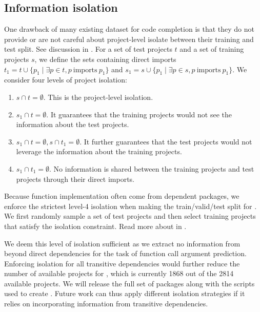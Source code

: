 \subsection{Information isolation} 
\label{sec:isolation}

One drawback of many existing dataset for code completion is that they do not provide or are not careful about project-level isolate between their training and test split. See discussion in .
For a set of test projects $t$ and a set of training projects $s$, we define the  sets containing direct imports $t_1 = t \cup \{p_1 \mid \exists p \in t, p~\text{imports}~p_1\}$ and $s_1 = s \cup \{p_1 \mid \exists p \in s, p~\text{imports}~p_1\}$.
We consider four levels of project isolation:
\begin{enumerate}[label={Level~\arabic*:},leftmargin=0em,itemindent=4em]
    \item $s \cap t = \emptyset$. This is the project-level isolation.
    \item $s_1 \cap t = \emptyset$. It guarantees that the training projects would not see the information about the test projects.
    \item $s_1 \cap t = \emptyset, s \cap t_1 = \emptyset$. It further guarantees that the test projects would not leverage the information about the training projects.
    \item $s_1 \cap t_1 = \emptyset$. No information is shared between the training projects and test projects through their direct imports.
\end{enumerate}
Because function implementation often come from dependent packages, we enforce the strictest level-4 isolation when making the train/valid/test split for \CallArgs. 
We first randomly sample a set of test projects and then select training projects that satisfy the isolation constraint.
Read more about \CallArgs in  .

We deem this level of isolation sufficient as we extract no information from beyond direct dependencies for the task of function call argument prediction.
Enforcing isolation for all transitive dependencies would further reduce the number of available projects for \CallArgs, which is currently 1868 out of the 2814 available projects. 
We will release the full set of \PyEnvs packages along with the scripts used to create \CallArgs. 
Future work can thus apply different isolation strategies if it relies on incorporating information from transitive dependencies.

